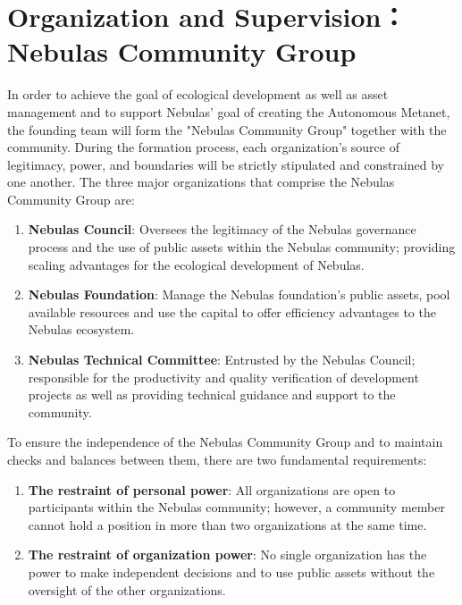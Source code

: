 \section{Organization and Supervision： Nebulas Community Group}

In order to achieve the goal of ecological development as well as asset management and to support Nebulas’ goal of creating the Autonomous Metanet, the founding team will form the "Nebulas Community Group" together with the community. During the formation process, each organization's source of legitimacy, power, and boundaries will be strictly stipulated and constrained by one another. The three major organizations that comprise the Nebulas Community Group are:

\begin{enumerate}
	\item \textbf{Nebulas Council}: Oversees the legitimacy of the Nebulas governance process and the use of public assets within the Nebulas community; providing scaling advantages for the ecological development of Nebulas.
	\item \textbf{Nebulas Foundation}: Manage the Nebulas foundation's public assets, pool available resources and use the capital to offer efficiency advantages to the Nebulas ecosystem.
	\item \textbf{Nebulas Technical Committee}: Entrusted by the Nebulas Council; responsible for the productivity and quality verification of development projects as well as providing technical guidance and support to the community.
\end{enumerate}

\vspace{2em}

To ensure the independence of the Nebulas Community Group and to maintain checks and balances between them, there are two fundamental requirements:

\begin{enumerate}
	\item \textbf{The restraint of personal power}: All organizations are open to participants within the Nebulas community; however, a community member cannot hold a position in more than two organizations at the same time.
	\item \textbf{The restraint of organization power}: No single organization has the power to make independent decisions and to use public assets without the oversight of the other organizations.
\end{enumerate}

